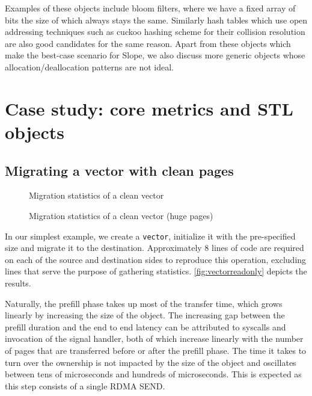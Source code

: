 Examples of these objects include bloom filters, where we have a fixed
array of bits the size of which always stays the same.
Similarly hash tables which use open addressing techniques such as cuckoo
hashing scheme for their collision resolution are also good candidates for the
same reason.
Apart from these objects which make the best-case scenario for Slope, we also
discuss more generic objects whose allocation/deallocation patterns are not
ideal.

\section{Case study: core metrics and STL objects}
\subsection{Migrating a vector with clean pages}
\label{sec:cleanvec}

\begin{figure}[tp]
    \begin{center}
        
    \end{center}
    \caption{Migration statistics of a clean vector}
    \label{fig:vectorreadonly}
\end{figure}

\begin{figure}[tp]
    \begin{center}
        
    \end{center}
    \caption{Migration statistics of a clean vector (huge pages)}
    \label{fig:vectorreadonlyhp}
\end{figure}

In our simplest example, we create a \texttt{vector}, initialize it with the
pre-specified size and migrate it to the destination. Approximately $8$ lines
of code are required on each of the source and destination sides to reproduce
this operation, excluding lines that serve the purpose of gathering statistics.
\autoref{fig:vectorreadonly} depicts the results.

Naturally, the prefill phase takes up most of the transfer time, which grows
linearly by increasing the size of the object. The increasing gap between the
prefill duration and the end to end latency can be attributed to syscalls and
invocation of the signal handler, both of which increase linearly with the
number of pages that are transferred before or after the prefill phase. The
time it takes to turn over the ownership is not impacted by the
size of the object and oscillates between tens of microseconds and hundreds
of microseconds. This is expected as this step consists of a single RDMA SEND.

